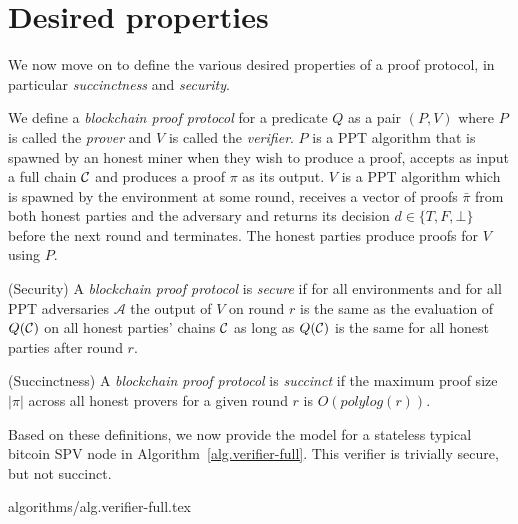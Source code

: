 \section{Desired properties}

We now move on to define the various desired properties of a proof protocol, in
particular \textit{succinctness} and \textit{security}.

We define a \textit{blockchain proof protocol} for a predicate $Q$ as a pair
$(P, V)$ where $P$ is called the \textit{prover} and $V$ is called the
\textit{verifier}. $P$ is a PPT algorithm that is spawned by an honest miner
when they wish to produce a proof, accepts as input a full chain $\mathcal{C}$ and
produces a proof $\pi$ as its output. $V$ is a PPT algorithm which is spawned
by the environment at some round, receives a vector of proofs $\bar{\pi}$ from
both honest parties and the adversary and returns its decision $d \in \{T, F,
\bot\}$ before the next round and terminates. The honest parties produce proofs
for $V$ using $P$.

\begin{definition}{(Security)}
A \textit{blockchain proof protocol} is \textit{secure} if for all environments
and for all PPT adversaries $\mathcal{A}$ the output of $V$ on round $r$ is the
same as the evaluation of $Q(\mathcal{C})$ on all honest parties' chains $\mathcal{C}$ as
long as $Q(\mathcal{C})$ is the same for all honest parties after round $r$.
\end{definition}

\begin{definition}{(Succinctness)}
A \textit{blockchain proof protocol} is \textit{succinct} if the maximum proof
size $|\pi|$ across all honest provers for a given round $r$ is
$O(polylog(r))$.
\end{definition}

Based on these definitions, we now provide the model for a stateless typical
bitcoin SPV node in Algorithm~\ref{alg.verifier-full}. This verifier is
trivially secure, but not succinct.

{algorithms/alg.verifier-full.tex}
